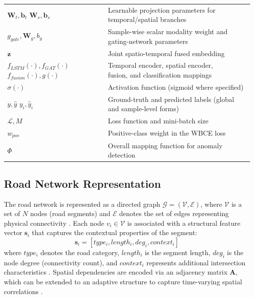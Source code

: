 \documentclass[journal]{IEEEtran}
\begin{document}
\begin{table}[!htbp]
\begin{tabular}{@{}p{}p{}@{}}
    \shortstack[l]{$\mathbf{W}_t, \mathbf{b}_t$\\$\mathbf{W}_s, \mathbf{b}_s$} & Learnable projection parameters for temporal/spatial branches \\
    $g_{gate}, \mathbf{W}_g, b_g$ & Sample-wise scalar modality weight and gating-network parameters \\
    $\mathbf{z}$ & Joint spatio-temporal fused embedding \\
    \shortstack[l]{$f_{LSTM}(\cdot), f_{GAT}(\cdot)$\\$f_{fusion}(\cdot), g(\cdot)$} & \shortstack[l]{Temporal encoder, spatial encoder,\\fusion, and classification mappings} \\
    $\sigma(\cdot)$ & Activation function (sigmoid where specified) \\
    \shortstack[l]{$y, \hat{y}$\\$y_i, \hat{y}_i$} & Ground-truth and predicted labels (global and sample-level forms) \\
    $\mathcal{L}, M$ & Loss function and mini-batch size \\
    $w_{pos}$ & Positive-class weight in the WBCE loss \\
    $\Phi$ & Overall mapping function for anomaly detection \\ \bottomrule
  \end{tabular}
\end{table}

\subsection{Road Network Representation}
The road network is represented as a directed graph $\mathcal{G} = (\mathcal{V}, \mathcal{E})$, where $\mathcal{V}$ is a set of $N$ nodes (road segments) and $\mathcal{E}$ denotes the set of edges representing physical connectivity \cite{li_graph_2023, park_graph_2025}. Each node $v_i \in \mathcal{V}$ is associated with a structural feature vector $\mathbf{s}_i$ that captures the contextual properties of the segment:
\begin{equation}
  \mathbf{s}_i = [type_i, length_i, deg_i, context_i]
\end{equation}
where $type_i$ denotes the road category, $length_i$ is the segment length, $deg_i$ is the node degree (connectivity count), and $context_i$ represents additional intersection characteristics \cite{chen_enhancing_2026, zhong_multi-factor_2025}. Spatial dependencies are encoded via an adjacency matrix $\mathbf{A}$, which can be extended to an adaptive structure to capture time-varying spatial correlations \cite{pan_dc-stgcn_2021, chang_stfdsgcn_2025}.
\end{document}

